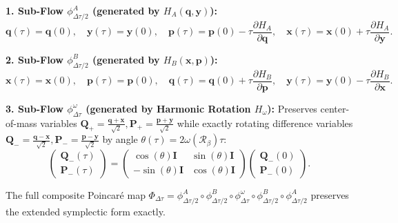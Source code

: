 \documentclass[11pt,a4paper,reqno]{article}
\theoremstyle{plain}
\theoremstyle{definition}
\theoremstyle{remark}
\numberwithin{equation}{section}
\begin{document}
\textbf{1. Sub-Flow $\phi_{\Delta \tau/2}^A$ (generated by $H_A(\bm{q}, \bm{y})$):}
\begin{equation}
\bm{q}(\tau) = \bm{q}(0), \quad \bm{y}(\tau) = \bm{y}(0), \quad \bm{p}(\tau) = \bm{p}(0) - \tau \frac{\partial H_A}{\partial \bm{q}}, \quad \bm{x}(\tau) = \bm{x}(0) + \tau \frac{\partial H_A}{\partial \bm{y}}.
\end{equation}

\textbf{2. Sub-Flow $\phi_{\Delta \tau/2}^B$ (generated by $H_B(\bm{x}, \bm{p})$):}
\begin{equation}
\bm{x}(\tau) = \bm{x}(0), \quad \bm{p}(\tau) = \bm{p}(0), \quad \bm{q}(\tau) = \bm{q}(0) + \tau \frac{\partial H_B}{\partial \bm{p}}, \quad \bm{y}(\tau) = \bm{y}(0) - \tau \frac{\partial H_B}{\partial \bm{x}}.
\end{equation}

\textbf{3. Sub-Flow $\phi_{\Delta \tau}^\omega$ (generated by Harmonic Rotation $H_\omega$):}
Preserves center-of-mass variables $\bm{Q}_+ = \frac{\bm{q} + \bm{x}}{\sqrt{2}}, \bm{P}_+ = \frac{\bm{p} + \bm{y}}{\sqrt{2}}$ while exactly rotating difference variables $\bm{Q}_- = \frac{\bm{q} - \bm{x}}{\sqrt{2}}, \bm{P}_- = \frac{\bm{p} - \bm{y}}{\sqrt{2}}$ by angle $\theta(\tau) = 2 \omega(\mathcal{R}_\beta) \tau$:
\begin{equation}
\begin{pmatrix} \bm{Q}_-(\tau) \\ \bm{P}_-(\tau) \end{pmatrix} = \begin{pmatrix} \cos(\theta) \bm{I} & \sin(\theta) \bm{I} \\ -\sin(\theta) \bm{I} & \cos(\theta) \bm{I} \end{pmatrix} \begin{pmatrix} \bm{Q}_-(0) \\ \bm{P}_-(0) \end{pmatrix}.
\end{equation}

The full composite Poincaré map $\Phi_{\Delta \tau} = \phi_{\Delta \tau / 2}^A \circ \phi_{\Delta \tau / 2}^B \circ \phi_{\Delta \tau}^\omega \circ \phi_{\Delta \tau / 2}^B \circ \phi_{\Delta \tau / 2}^A$ preserves the extended symplectic form exactly.
\end{document}
